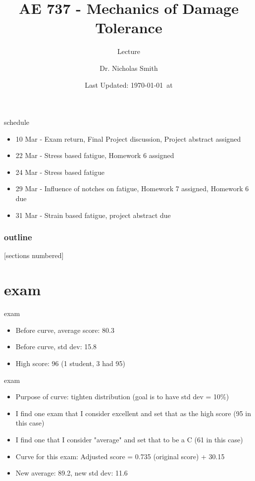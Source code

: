 \documentclass[10pt]{beamer}
\title{AE 737 - Mechanics of Damage Tolerance}
\subtitle{Lecture \arabic{lecture}}
\date{Last Updated: \today\ at \DTMcurrenttime}
\author{Dr. Nicholas Smith}
\institute{Wichita State University, Department of Aerospace Engineering}
\begin{document}
\maketitle
\begin{frame}{schedule}
	\begin{itemize}
		\item 10 Mar - Exam return, Final Project discussion, Project abstract assigned
		\item 22 Mar - Stress based fatigue, Homework 6 assigned
		\item 24 Mar - Stress based fatigue
		\item 29 Mar - Influence of notches on fatigue, Homework 7 assigned, Homework 6 due
		\item 31 Mar - Strain based fatigue, project abstract due
	\end{itemize}
\end{frame}

\begin{frame}
  \frametitle{outline}
  [sections numbered]
  \tableofcontents[hideallsubsections]
\end{frame}

\section{exam}

\begin{frame}{exam}
	\begin{itemize}[<+->]
		\item Before curve, average score: 80.3
		\item Before curve, std dev: 15.8
		\item High score: 96 (1 student, 3 had 95)
	\end{itemize}
\end{frame}

\begin{frame}{exam}
	\begin{itemize}[<+->]
		\item Purpose of curve: tighten distribution (goal is to have std dev = 10\%)
		\item I find one exam that I consider excellent and set that as the high score (95 in this case)
		\item I find one that I consider "average" and set that to be a C (61 in this case)
		\item Curve for this exam: Adjusted score = 0.735 (original score) + 30.15
		\item New average: 89.2, new std dev: 11.6
	\end{itemize}
\end{frame}
\end{document}
